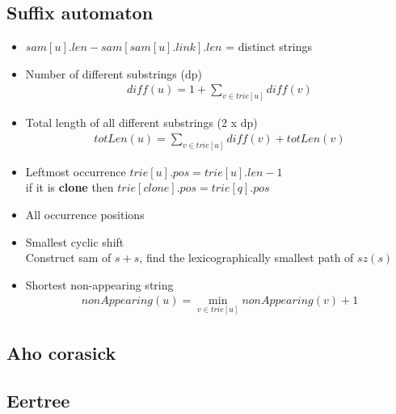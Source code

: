 
\subsection{Suffix automaton}
\vspace{-5pt}
\begin{itemize}[noitemsep]
  \item 
  $sam[u].len- sam[sam[u].link].len$ = distinct strings

  \item Number of different substrings (dp)
  \begin{gather*}
    diff(u)=1+\sum_{v \in trie[u]}{diff(v)}
  \end{gather*}

  \item Total length of all different substrings (2 x dp)
  \begin{gather*}
    totLen(u)=\sum_{v \in trie[u]}{diff(v) + totLen(v)}
  \end{gather*}
  
  \item Leftmost occurrence
  $trie[u].pos = trie[u].len - 1$ \\
  if it is \textbf{clone} then $trie[clone].pos = trie[q].pos$ 
  
  \item All occurrence positions
  
  \item Smallest cyclic shift \\
  Construct sam of $s + s$, find the lexicographically smallest path of $sz(s)$
 
  \item Shortest non-appearing string
  \begin{gather*}
    nonAppearing(u) = \min_{v \in trie[u]}{nonAppearing(v) + 1}
  \end{gather*}
\end{itemize}
\vspace{-15pt}

\subsection{Aho corasick}

\subsection{Eertree}
